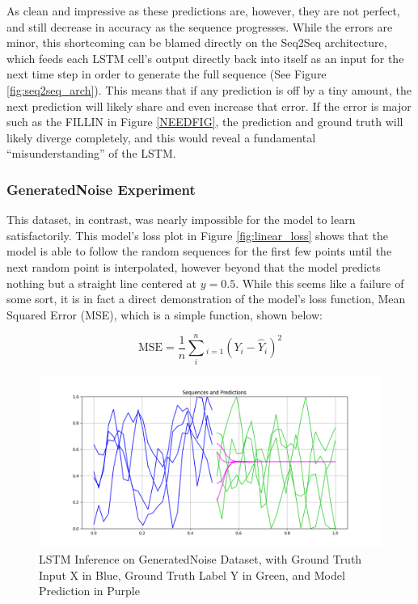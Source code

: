 \documentclass{scrartcl}
\begin{document}
As clean and impressive as these predictions are, however, they are not
perfect, and still decrease in accuracy as the sequence progresses. While the
errors are minor, this shortcoming can be blamed directly on the Seq2Seq
architecture, which feeds each LSTM cell's output directly back into itself as
an input for the next time step in order to generate the full sequence (See
Figure \ref{fig:seq2seq_arch}). This means that if any prediction is off by a
tiny amount, the next prediction will likely share and even increase that
error. If the error is major such as the FILLIN in Figure \ref{NEEDFIG},
the prediction and ground truth will likely diverge completely, and this would
reveal a fundamental ``misunderstanding'' of the LSTM.

\subsubsection{GeneratedNoise Experiment}
\label{subsubsec:generated_noise}

This dataset, in contrast, was nearly impossible for the model to learn
satisfactorily. This model's loss plot in Figure \ref{fig:linear_loss} shows
that the model is able to follow the random sequences for the first few points
until the next random point is interpolated, however beyond that the model
predicts nothing but a straight line centered at $y = 0.5$. While this seems
like a failure of some sort, it is in fact a direct demonstration of the model's
loss function, Mean Squared Error (MSE), which is a simple function, shown below: 

\begin{equation}
	\text{MSE} = \frac{1}{n} \sum_{i}^n_{i = 1} ( Y_i - \hat{Y}_i )^2
	 \label{eq:mseloss}
\end{equation}

\begin{figure}[H]
	\centering
	\includegraphics[width=1\textwidth]{plots/lstm_noise_inference.png}
	\caption{LSTM Inference on GeneratedNoise Dataset, with Ground Truth Input X in Blue, Ground Truth Label Y in Green, and Model Prediction in Purple}
	\label{plt:lstm_noise_inference}
\end{figure}
\end{document}
